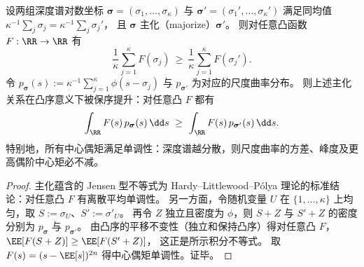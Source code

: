 \begin{proposition}\label{prop:xi-depth-spectrum-majorization-convex-order}
设两组深度谱对数坐标
\(
\boldsymbol{\sigma}=(\sigma_1,\dots,\sigma_\kappa)
\)
与
\(
\boldsymbol{\sigma}'=(\sigma_1',\dots,\sigma_\kappa')
\)
满足同均值
\(
\kappa^{-1}\sum_j\sigma_j=\kappa^{-1}\sum_j\sigma_j'
\)，
且 \(\boldsymbol{\sigma}\) 主化（majorize）\(\boldsymbol{\sigma}'\)。
则对任意凸函数 \(F:\RR\to\RR\) 有
\[
\frac{1}{\kappa}\sum_{j=1}^{\kappa}F(\sigma_j)\ \ge\ \frac{1}{\kappa}\sum_{j=1}^{\kappa}F(\sigma_j').
\]
令 \(p_{\boldsymbol{\sigma}}(s):=\kappa^{-1}\sum_{j=1}^{\kappa}\phi(s-\sigma_j)\) 与 \(p_{\boldsymbol{\sigma}'}\) 为对应的尺度曲率分布。
则上述主化关系在凸序意义下被保序提升：对任意凸 \(F\) 都有
\[
\int_{\RR}F(s)\,p_{\boldsymbol{\sigma}}(s)\,\dd s\ \ge\ \int_{\RR}F(s)\,p_{\boldsymbol{\sigma}'}(s)\,\dd s.
\]
特别地，所有中心偶矩满足单调性：深度谱越分散，则尺度曲率的方差、峰度及更高偶阶中心矩必不减。
\end{proposition}
\begin{proof}
主化蕴含的 Jensen 型不等式为 Hardy--Littlewood--P\'olya 理论的标准结论：对任意凸 \(F\) 有离散平均单调性。
另一方面，令随机变量 \(U\) 在 \(\{1,\dots,\kappa\}\) 上均匀，取 \(S:=\sigma_U\)、\(S':=\sigma'_U\)。
再令 \(Z\) 独立且密度为 \(\phi\)，则 \(S+Z\) 与 \(S'+Z\) 的密度分别为 \(p_{\boldsymbol{\sigma}}\) 与 \(p_{\boldsymbol{\sigma}'}\)。
由凸序的平移不变性（独立和保持凸序）得对任意凸 \(F\)，
\(
\EE[F(S+Z)]\ge \EE[F(S'+Z)]
\)，
这正是所示积分不等式。
取 \(F(s)=(s-\EE[s])^{2n}\) 得中心偶矩单调性。证毕。
\end{proof}

